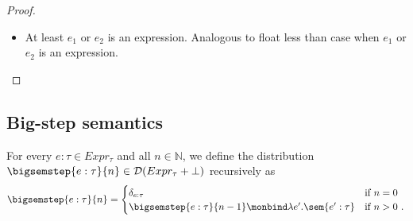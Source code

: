\begin{proof}
\begin{itemize}
		If $e_1 = v$ and $e_2 = w$, then by Lemma~\ref{lem:form-preservation}, $\discretize{v} = v'$ and $\discretize{w} = w'$ are also values, namely discretized values where $v'$ and $w'$ are indices of $\intervals{B_1}$ and $\intervals{B_2}$, by definition of the discretization function (float constant case). 
		
		By Definition~\ref{def:distinguishes} and the definition of the discretization function (float constant case), the existence of unique values $v_i \in V_1$ and $w_j \in V_2$ such that $\discretize{v_i : \floattype{B_1}{V_1}} = v'$ and $\discretize{w_j : \floattype{B_2}{V_2}} = w'$ is guaranteed. In particular, $v_i = v$ and $w_j = w$ by construction.

		Since $v_i$ and $w_j$ are values and $B \neq \top$, by definition of the discretization function (uniform case where $B \neq \top$ and $e_1,e_2 \in \R$):
		\[
			\discretize{\uniform(v_i,w_j) : \floattype{B}{\top}} = \discrete(p_0, \ldots, p_{|B|})
		\]
		where $p_k$ denotes the difference in the CDF of $\uniform(v_i,w_j)$ evaluated at consecutive cuts of $B$. 

		So,

		\begin{align*}
			\sem{ \uniform(v : \tau_1, w : \tau_2) : \tau, \discrete(p_0, \ldots, p_{|B|}) : \discretize{\tau}}
		\end{align*}

		\item At least $e_1$ or $e_2$ is an expression. Analogous to float less than case when $e_1$ or $e_2$ is an expression.

	\end{itemize}
\end{proof}

\subsection{Big-step semantics}
For every $e : \tau \in Expr_{\tau}$ and all $n \in \mathbb{N}$, we define the distribution $\bigsemstep{e : \tau}{n} \in \mathcal{D}(Expr_{\tau} + \bot)$ recursively as
%
\[
	\bigsemstep{e : \tau}{n} = 
	\begin{cases}
		\delta_{e : \tau} & \text{if $n = 0$} \\
		\bigsemstep{e : \tau}{n-1} \monbind  \lambda e'. \sem{e' : \tau} & \text{if $n > 0$}~.
	\end{cases}
\]

